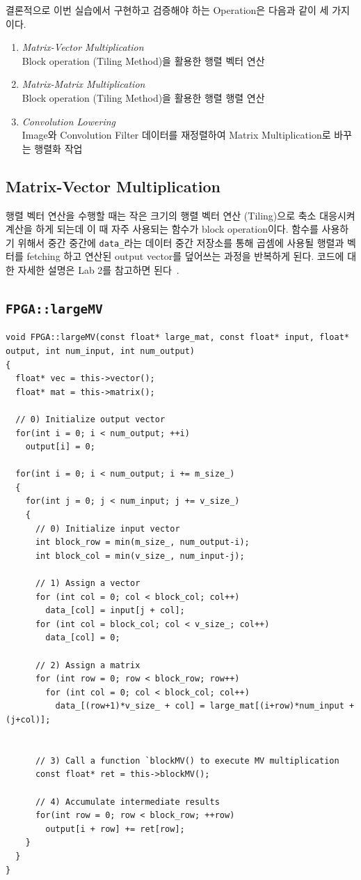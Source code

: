 \documentclass{article}
\begin{document}
결론적으로 이번 실습에서 구현하고 검증해야 하는 Operation은 다음과 같이 세 가지이다.
\begin{enumerate}
    \item \textit{Matrix-Vector Multiplication}\\
    Block operation (Tiling Method)을 활용한 행렬 벡터 연산
    \item \textit{Matrix-Matrix Multiplication}\\
    Block operation (Tiling Method)을 활용한 행렬 행렬 연산
    \item \textit{Convolution Lowering} \\
    Image와 Convolution Filter 데이터를 재정렬하여 Matrix Multiplication로 바꾸는 행렬화 작업~\cite{chellapilla2006high, chetlur2014cudnn}
\end{enumerate}

\subsection{Matrix-Vector Multiplication}
\label{sec:mv}
행렬 벡터 연산을 수행할 때는 작은 크기의 행렬 벡터 연산 (Tiling)으로 축소 대응시켜 계산을 하게 되는데 이 때 자주 사용되는 함수가 block operation이다. 함수를 사용하기 위해서 중간 중간에 \texttt{data\_}라는 데이터 중간 저장소를 통해 곱셈에 사용될 행렬과 벡터를 fetching 하고 연산된 output vector를 덮어쓰는 과정을 반복하게 된다. 코드에 대한 자세한 설명은 Lab 2를 참고하면 된다~\cite{lab2}.

\subsection*{\texttt{FPGA::largeMV}}
\begin{lstlisting}[style={c-style}]
void FPGA::largeMV(const float* large_mat, const float* input, float* output, int num_input, int num_output)
{
  float* vec = this->vector();
  float* mat = this->matrix();

  // 0) Initialize output vector		
  for(int i = 0; i < num_output; ++i)
    output[i] = 0;

  for(int i = 0; i < num_output; i += m_size_)
  {
    for(int j = 0; j < num_input; j += v_size_)
    {			
      // 0) Initialize input vector
      int block_row = min(m_size_, num_output-i);
      int block_col = min(v_size_, num_input-j);
            
      // 1) Assign a vector
      for (int col = 0; col < block_col; col++)
        data_[col] = input[j + col];
      for (int col = block_col; col < v_size_; col++)
        data_[col] = 0;

      // 2) Assign a matrix
      for (int row = 0; row < block_row; row++)
        for (int col = 0; col < block_col; col++)
          data_[(row+1)*v_size_ + col] = large_mat[(i+row)*num_input + (j+col)];


      // 3) Call a function `blockMV() to execute MV multiplication
      const float* ret = this->blockMV();

      // 4) Accumulate intermediate results
      for(int row = 0; row < block_row; ++row)
        output[i + row] += ret[row];
    } 
  }
}
\end{lstlisting}
\end{document}
